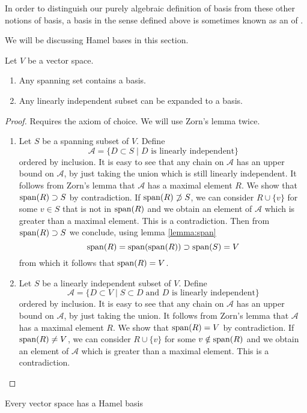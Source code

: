In order to distinguish our purely algebraic definition of basis from these other notions of basis, a basis in the sense defined above is sometimes known as an  of .

We will be discussing Hamel bases in this section.

\begin{theorem}
Let $V$ be a vector space.
\begin{enumerate}
\item Any spanning set contains a basis.
\item Any linearly independent subset can be expanded to a basis.
\end{enumerate}
\label{theorem:infBasis}
\end{theorem}
\begin{proof}
Requires the axiom of choice. We will use Zorn's lemma twice.
\begin{enumerate}
\item Let $S$ be a spanning subset of $V$. Define
\[ \mathcal{A} = \{ D\subset S \;|\; \text{$D$ is linearly independent}\} \]
ordered by inclusion. It is easy to see that any chain on $\mathcal{A}$ has an upper bound on $\mathcal{A}$, by just taking the union which is still linearly independent. It follows from Zorn's lemma that $\mathcal{A}$ has a maximal element $R$. 
We show that $\operatorname{span}(R) \supset S$ by contradiction. If $\operatorname{span}(R) \not\supset S$, we can consider $R\cup \{v\}$ for some $v \in S$ that is not in $\operatorname{span}(R)$ and we obtain an element of $\mathcal{A}$ which is greater than a maximal element. This is a contradiction. Then from $\operatorname{span}(R) \supset S$ we conclude, using lemma \ref{lemma:span}
\[ \operatorname{span}(R) = \operatorname{span}(\operatorname{span}(R)) \supset \operatorname{span}(S) = V \]
from which it follows that $\operatorname{span}(R) = V$.
\item Let $S$ be a linearly independent subset of $V$. Define
\[ \mathcal{A} = \{ D\subset V \;|\; S \subset D \; \text{and $D$ is linearly independent}\} \]
ordered by inclusion. 
It is easy to see that any chain on $\mathcal{A}$ has an upper bound on $\mathcal{A}$, by just taking the union. It follows from Zorn's lemma that $\mathcal{A}$ has a maximal element $R$. We show that $\operatorname{span}(R) = V$ by contradiction. If $\operatorname{span}(R) \neq V$, we can consider $R\cup \{v\}$ for some $v\notin \operatorname{span}(R)$ and we obtain an element of $\mathcal{A}$ which is greater than a maximal element. This is a contradiction.
\end{enumerate}
\end{proof}
\begin{corollary}
Every vector space has a Hamel basis
\end{corollary}

